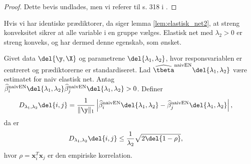 %
\begin{proof}
Dette bevis undlades, men vi referer til s. 318 i \citep{zou_hastie}.
%
\end{proof}
Hvis vi har identiske prædiktorer, da siger lemma \ref{lem:elastisk_net2}, at streng konveksitet sikrer at alle variable i en gruppe vælges.
Elastisk net med \(\lambda_2 > 0\) er streng konveks, og har dermed denne egenskab, som ønsket.
%
\begin{thm} \label{thm:elastisk_net}
Givet data \(\del{\y, \X}\) og parametrene \(\del{\lambda_1, \lambda_2}\), hvor responsvariablen er centreret og prædiktorerne er standardiseret.
Lad \(\widehat{\tbeta}^\text{naivEN} \del{\lambda_1, \lambda_2}\) være estimatet for naiv elastisk net.
Antag \(\widehat{\beta}^\text{naivEN}_i \del{\lambda_1, \lambda_2} \widehat{\beta}^\text{naivEN}_j \del{\lambda_1, \lambda_2} > 0\).
Definer
\begin{align*}
D_{\lambda_1, \lambda_2} \del{i,j} = \frac{1}{\Vert \y \Vert_1} \left\vert \widehat{\beta}^\text{naivEN}_i \del{\lambda_1, \lambda_2} - \widehat{\beta}^\text{naivEN}_j \del{\lambda_1, \lambda_2} \right\vert,
\end{align*}
da er
\begin{align}
D_{\lambda_1, \lambda_2} \del{i,j} \leq \frac{1}{\lambda_2} \sqrt{2 \del{1-\rho}}, \label{eq:EN5}
\end{align}
hvor \(\rho = \mathbf{x}_i^T \mathbf{x}_j\) er den empiriske korrelation.
\end{thm}
